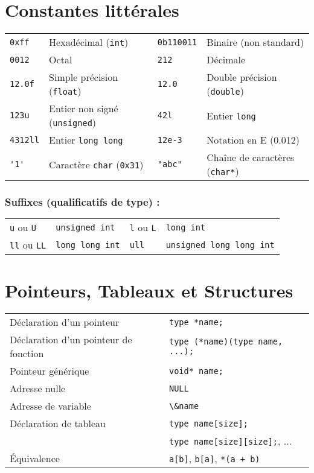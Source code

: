 \documentclass{article}
\newcommand{\cd}{\lstinline}
\begin{document}
\begin{multicols*}{3}
\section*{Constantes littérales}

\begin{tabularx}{\linewidth}{
  >{\hsize=0.4\hsize}X%
  >{\hsize=1.5\hsize}X%
  >{\hsize=0.6\hsize}X%
  >{\hsize=1.5\hsize}X%
  }

  \cd{0xff}    & Hexadécimal (\texttt{int}) & \cd{0b110011}    & Binaire (non standard) \\
  \cd{0012}    & Octal & \cd{212}    & Décimale \\
  \cd{12.0f}   & Simple précision (\cd{float})& \cd{12.0}    & Double précision (\cd{double})\\ \hline
  \cd{123u}    & Entier non signé (\cd{unsigned}) & \cd{42l}     & Entier \cd{long} \\
  \cd{4312ll}  & Entier \cd{long long} & \cd{12e-3} & Notation en E (0.012) \\ \hline
  \cd{'1'}     & Caractère \cd{char} (\cd{0x31}) & \cd{"abc"} & Chaîne de caractères (\cd{char*}) \\ \hline

\end{tabularx}
\subsubsection*{Suffixes (qualificatifs de type) :}
\begin{tabularx}{\linewidth}{
  >{\hsize=0.5\hsize}X%
  >{\hsize=1.1\hsize}X%
  >{\hsize=0.9\hsize}X%
  >{\hsize=1.5\hsize}X%
  }
  \cd{u} ou \cd{U}  & \cd{unsigned int} & \cd{l} ou \cd{L} & \cd{long int} \\
  \cd{ll} ou \cd{LL}  & \cd{long long int} & \cd{ull} & \cd{unsigned long long int} \\
\end{tabularx}

\section*{Pointeurs, Tableaux et Structures}
\begin{tabularx}{\linewidth}{Xl}
  Déclaration d'un pointeur & \cd{type *name;} \\
  Déclaration d'un pointeur de fonction & \cd{type (*name)(type name, ...);} \\
  Pointeur générique & \cd{void* name;} \\
  Adresse nulle & \cd{NULL} \\
  Adresse de variable & \cd{\&name} \\
  Déclaration de tableau & \cd{type name[size];} \\
                         & \cd{type name[size][size];}, ... \\
  Équivalence & \cd{a[b]}, \cd{b[a]}, \cd{*(a + b)}
\end{tabularx}


\end{multicols*}
\end{document}
